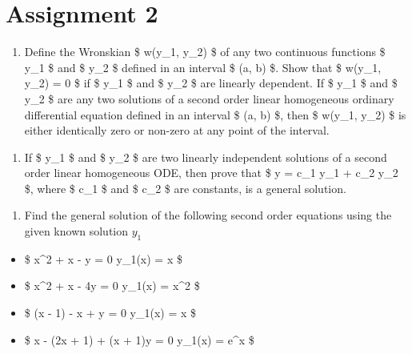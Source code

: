 \documentclass{article}
\begin{document}
    
    \maketitle
    
    

    
    \hypertarget{assignment-2}{%
\section{Assignment 2}\label{assignment-2}}

    \begin{enumerate}
\def\labelenumi{\arabic{enumi}.}
\tightlist
\item
  Define the Wronskian \$ w(y\_1, y\_2) \$ of any two continuous
  functions \$ y\_1 \$ and \$ y\_2 \$ defined in an interval \$ (a, b)
  \subset {} \$. Show that \$ w(y\_1, y\_2) = 0 \$ if \$ y\_1 \$
  and \$ y\_2 \$ are linearly dependent. If \$ y\_1 \$ and \$ y\_2 \$
  are any two solutions of a second order linear homogeneous ordinary
  differential equation defined in an interval \$ (a, b)
  \subset {} \$, then \$ w(y\_1, y\_2) \$ is either identically
  zero or non-zero at any point of the interval.
\end{enumerate}

    \begin{enumerate}
\def\labelenumi{\arabic{enumi}.}
\setcounter{enumi}{1}
\tightlist
\item
  If \$ y\_1 \$ and \$ y\_2 \$ are two linearly independent solutions of
  a second order linear homogeneous ODE, then prove that \$ y = c\_1
  y\_1 + c\_2 y\_2 \$, where \$ c\_1 \$ and \$ c\_2 \$ are constants, is
  a general solution.
\end{enumerate}

    \begin{enumerate}
\def\labelenumi{\arabic{enumi}.}
\setcounter{enumi}{2}
\tightlist
\item
  Find the general solution of the following second order equations
  using the given known solution \(y_1\)
\end{enumerate}

\begin{itemize}
\tightlist
\item
  \$ x\^{}2  + x  - y = 0
  \quad {} y\_1(x) = x \$
\item
  \$ x\^{}2  + x  - 4y = 0
  \quad {} y\_1(x) = x\^{}2 \$
\item
  \$ (x - 1)  - x  + y = 0
  \quad {} y\_1(x) = x \$
\item
  \$ x  - (2x + 1)  + (x + 1)y = 0
  \quad {} y\_1(x) = e\^{}x \$
\end{itemize}
\end{document}
